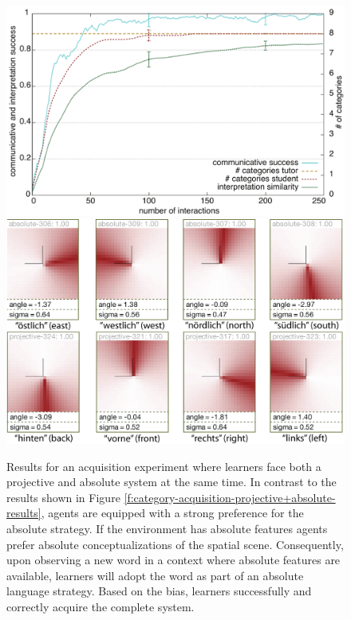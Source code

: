 \begin{figure} 
\begin{center}
\includegraphics[width=0.8\columnwidth]{figs/category-acquisition-projective+absolute-biased-results+categories-1}
\includegraphics[width=0.8\columnwidth]{figs/category-acquisition-projective+absolute-biased-results+categories-2.png}
\end{center}
\caption[Preference based acquisition of proximal and absolute systems]{%
Results for an acquisition experiment where learners face 
both a projective and absolute system
at the same time. In contrast to the results shown in Figure \ref{f:category-acquisition-projective+absolute-results}, agents are equipped with a strong preference for the absolute strategy. If the environment
has absolute features agents prefer absolute conceptualizations of the spatial scene. 
Consequently, upon observing a new word in a context where absolute features are available, learners 
will adopt the word as part of an absolute language strategy. Based
on the bias, learners successfully and correctly acquire the complete system.}
\label{f:category-acquisition-projective+absolute-biased-results}
\end{figure}



